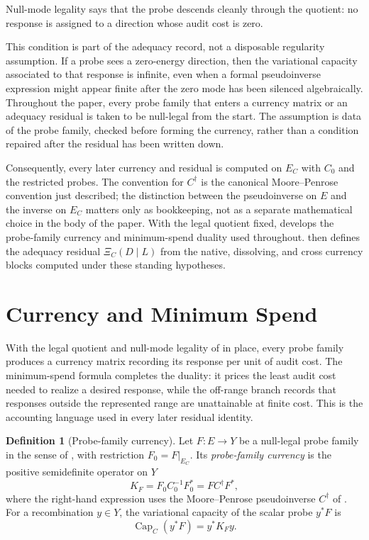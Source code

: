 \documentclass[11pt]{article}
\DeclareMathOperator{\Capacity}{Cap}
\theoremstyle{definition}
\newtheorem{definition}[theorem]{Definition}
\begin{document}
Null-mode legality says that the probe descends cleanly through the quotient:
no response is assigned to a direction whose audit cost is zero.

This condition is part of the adequacy record, not a disposable regularity
assumption.  If a probe sees a zero-energy direction, then the variational
capacity associated to that response is infinite, even when a formal
pseudoinverse expression might appear finite after the zero mode has been
silenced algebraically.  Throughout the paper, every probe family that enters a
currency matrix or an adequacy residual is taken to be null-legal from the
start.  The assumption is data of the probe family, checked before forming the
currency, rather than a condition repaired after the residual has been written
down.

Consequently, every later currency and residual is computed on \(E_C\) with
\(C_0\) and the restricted probes.  The convention for \(C^\dagger\) is the
canonical Moore--Penrose convention just described; the distinction between the
pseudoinverse on \(E\) and the inverse on \(E_C\) matters only as bookkeeping,
not as a separate mathematical choice in the body of the paper.  With the legal
quotient fixed,  develops the probe-family currency and
minimum-spend duality used throughout.   then
defines the adequacy residual \(\Xi_C(D\mid L)\) from the native, dissolving,
and cross currency blocks computed under these standing hypotheses.
 \section{Currency and Minimum Spend}
\label{sec:currency}

With the legal quotient and null-mode legality of  in place,
every probe family produces a currency matrix recording its response per unit
of audit cost.  The minimum-spend formula completes the duality: it prices the
least audit cost needed to realize a desired response, while the off-range
branch records that responses outside the represented range are unattainable at
finite cost.  This is the accounting language used in every later residual
identity.

\begin{definition}[Probe-family currency]\label{def:xi:probe-family-currency}
Let \(F\colon E\to Y\) be a null-legal probe family in the sense of
, with restriction \(F_0=F|_{E_C}\).
Its \emph{probe-family currency} is the positive semidefinite operator on \(Y\)
\[
  K_F = F_0C_0^{-1}F_0^* = FC^{\dagger}F^*,
\]
where the right-hand expression uses the Moore--Penrose pseudoinverse
\(C^\dagger\) of .  For a recombination
\(y\in Y\), the variational capacity of the scalar probe \(y^*F\) is
\[
  \Capacity_C(y^*F)=y^*K_Fy.
\]
\end{definition}
\end{document}
